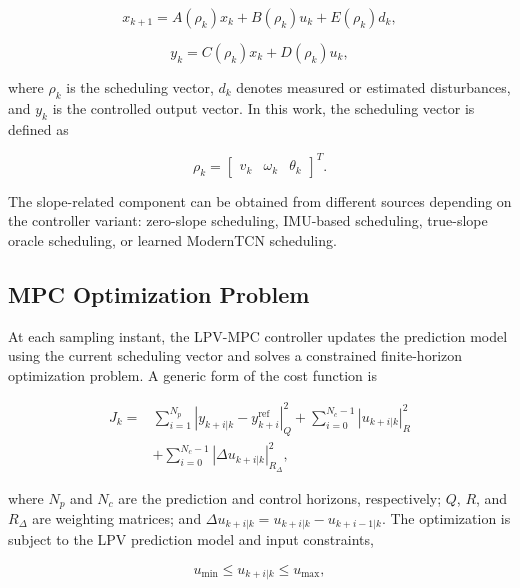 \documentclass{ieeeaccess}
\begin{document}
\begin{equation}
x_{k+1} =
A(\rho_k)x_k + B(\rho_k)u_k + E(\rho_k)d_k,
\label{eq:lpv_state}
\end{equation}

\begin{equation}
y_k = C(\rho_k)x_k + D(\rho_k)u_k,
\label{eq:lpv_output}
\end{equation}

where $\rho_k$ is the scheduling vector, $d_k$ denotes measured or estimated disturbances, and $y_k$ is the controlled output vector. In this work, the scheduling vector is defined as

\begin{equation}
\rho_k =
\begin{bmatrix}
v_k & \omega_k & \theta_k
\end{bmatrix}^{T}.
\label{eq:scheduling_vector}
\end{equation}

The slope-related component can be obtained from different sources depending on the controller variant: zero-slope scheduling, IMU-based scheduling, true-slope oracle scheduling, or learned ModernTCN scheduling.

\subsection{MPC Optimization Problem}

At each sampling instant, the LPV-MPC controller updates the prediction model using the current scheduling vector and solves a constrained finite-horizon optimization problem. A generic form of the cost function is

\begin{equation}
\begin{aligned}
J_k =
& \sum_{i=1}^{N_p}
\left|
y_{k+i|k} - y^{\mathrm{ref}}_{k+i}
\right|_{Q}^{2}
+
\sum_{i=0}^{N_c-1}
\left|
u_{k+i|k}
\right|_{R}^{2} \\
& +
\sum_{i=0}^{N_c-1}
\left|
\Delta u_{k+i|k}
\right|_{R_{\Delta}}^{2},
\end{aligned}
\label{eq:mpc_cost}
\end{equation}

where $N_p$ and $N_c$ are the prediction and control horizons, respectively; $Q$, $R$, and $R_{\Delta}$ are weighting matrices; and $\Delta u_{k+i|k}=u_{k+i|k}-u_{k+i-1|k}$. The optimization is subject to the LPV prediction model and input constraints,

\begin{equation}
u_{\min} \leq u_{k+i|k} \leq u_{\max},
\label{eq:input_constraint}
\end{equation}
\end{document}
